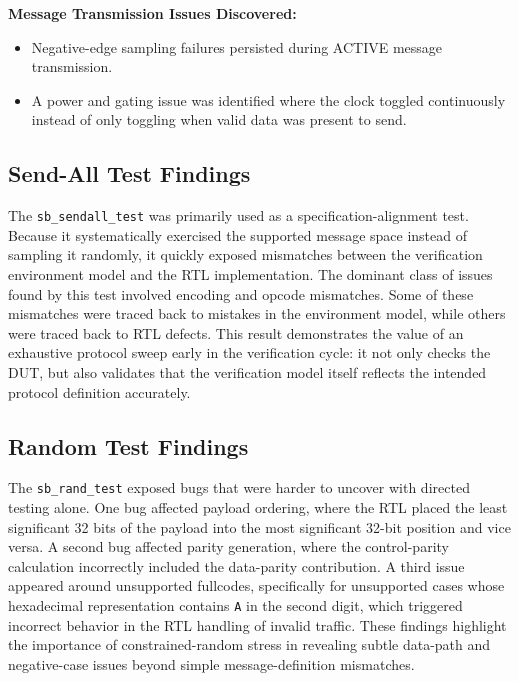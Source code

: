 \textbf{Message Transmission Issues Discovered:}
\begin{itemize}
    \item Negative-edge sampling failures persisted during ACTIVE message transmission.
    \item A power and gating issue was identified where the clock toggled continuously instead of only toggling when valid data was present to send.
\end{itemize}

\subsection{Send-All Test Findings}
The \texttt{sb\_sendall\_test} was primarily used as a specification-alignment test. Because it systematically exercised the supported message space instead of sampling it randomly, it quickly exposed mismatches between the verification environment model and the RTL implementation. The dominant class of issues found by this test involved encoding and opcode mismatches. Some of these mismatches were traced back to mistakes in the environment model, while others were traced back to RTL defects. This result demonstrates the value of an exhaustive protocol sweep early in the verification cycle: it not only checks the DUT, but also validates that the verification model itself reflects the intended protocol definition accurately.


\subsection{Random Test Findings}
The \texttt{sb\_rand\_test} exposed bugs that were harder to uncover with directed testing alone. One bug affected payload ordering, where the RTL placed the least significant 32 bits of the payload into the most significant 32-bit position and vice versa. A second bug affected parity generation, where the control-parity calculation incorrectly included the data-parity contribution. A third issue appeared around unsupported fullcodes, specifically for unsupported cases whose hexadecimal representation contains \texttt{A} in the second digit, which triggered incorrect behavior in the RTL handling of invalid traffic. These findings highlight the importance of constrained-random stress in revealing subtle data-path and negative-case issues beyond simple message-definition mismatches.

